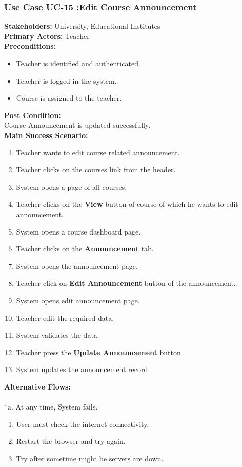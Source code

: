 \documentclass[12pt]{article}
\begin{document}
\subsubsection{Use Case UC-15 :Edit Course Announcement}
\textbf{Stakeholders: } University, Educational Institutes \\
\textbf{Primary Actors: }Teacher \\
\textbf{Preconditions:}
\begin{itemize}
\item Teacher is identified and authenticated.
\item Teacher is logged in the system.
\item Course is assigned to the teacher.
\end{itemize}
\textbf{Post Condition: }\\
Course Announcement is updated successfully.\\
\newpage
\textbf{Main Success Scenario:}
\begin{enumerate}
\item Teacher wants to edit course related announcement.
\item Teacher clicks on the courses link from the header.
\item System opens a page of all courses.
\item Teacher clicks on the \textbf{View} button of course of which he wants to edit announcement.
\item System opens a course dashboard page.
\item Teacher clicks on the \textbf{Announcement} tab.
\item System opens the announcement page.
\item Teacher click on \textbf{Edit Announcement} button of the announcement.
\item System opens edit announcement page.
\item Teacher edit the required data.
\item System validates the data.
\item Teacher press the \textbf{Update Announcement} button.
\item System updates the announcement record.
\end{enumerate}
\textbf{Alternative Flows:}\\
\\
*a. At any time, System fails.
\begin{enumerate}
\item User must check the internet connectivity.
\item Restart the browser and try again.
\item Try after sometime might be servers are down.
\end{enumerate}
\end{document}
